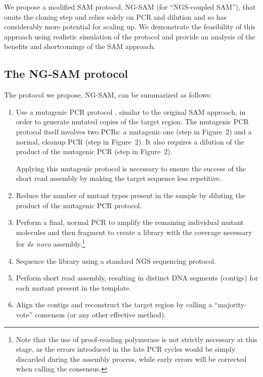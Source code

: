 \documentclass[10pt]{article}
\newcommand{\red}[1]{{\color{red} #1}}
\newcommand{\blue}[1]{{\color{blue} #1}}
\begin{document}
We propose a modified SAM protocol, NG-SAM (for ``NGS-coupled SAM''), that omits the cloning step and relies solely on PCR and dilution and so has considerably more potential for scaling up. We demonstrate the feasibility of this approach using realistic simulation of the protocol and provide an analysis of the benefits and shortcomings of the SAM approach.

\subsection*{The NG-SAM protocol}

The protocol we propose, NG-SAM, can be summarized as follows:

\begin{enumerate}
\item Use a mutagenic PCR protocol \red{\cite{mutkit}}, similar to the original SAM approach, in order to generate mutated copies of the target region. The mutagenic PCR protocol itself involves two PCRs: \red{a mutagenic one (step  in Figure~2) and a normal, cleanup PCR (step \ding{192}{\bf C} in Figure~2). It also requires a dilution of the product of the mutagenic PCR (step \ding{192}{\bf B} in Figure~2).}

\red{Applying this mutagenic protocol} is necessary to ensure the success of the short read assembly by making the target sequence less repetitive.

\item Reduce the number of mutant types present in the sample by diluting the product of the mutagenic PCR protocol.

\item Perform a \red{final, normal} PCR to amplify the remaining individual mutant molecules and then fragment to create a library with the coverage necessary for {\it de novo} assembly.\footnote{Note that the use of proof-reading polymerase is not strictly necessary at this stage, as the errors introduced in the late PCR cycles would be simply discarded during the assembly process, while \blue{early errors will be corrected} when calling the consensus.}

\item Sequence the library using a standard NGS sequencing protocol.

\item Perform short read assembly, resulting in distinct DNA segments (contigs) for each mutant present in the template. 

\item Align the contigs and reconstruct the target region by calling a ``majority-vote'' consensus (or any other effective method). 

\end{enumerate}
\end{document}
